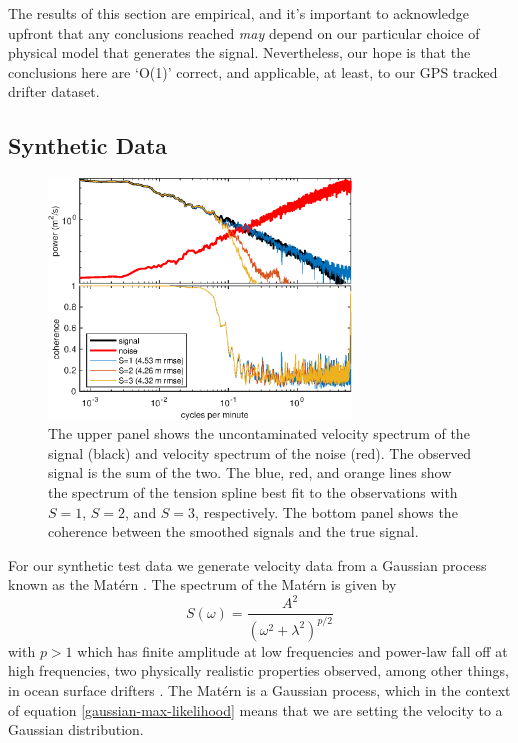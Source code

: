 \documentclass[10pt,journal]{IEEEtran}
\begin{document}
The results of this section are empirical, and it's important to acknowledge upfront that any conclusions reached \emph{may} depend on our particular choice of physical model that generates the signal. Nevertheless, our hope is that the conclusions here are `O(1)' correct, and applicable, at least, to our GPS tracked drifter dataset.

\subsection{Synthetic Data} \label{sec:synthetic_data}

\begin{figure}
  \centerline{\includegraphics[width=19pc,angle=0]{figures/synthetic_process_and_spectrum_slope2degreeVaried}}
  
  \caption{The upper panel shows the uncontaminated velocity spectrum of the signal (black) and velocity spectrum of the noise (red). The observed signal is the sum of the two. The blue, red, and orange lines show the spectrum of the tension spline best fit to the observations with $S=1$, $S=2$, and $S=3$, respectively. The bottom panel shows the coherence between the smoothed signals and the true signal.}
  \label{varied_slope}
\end{figure}

For our synthetic test data we generate velocity data from a Gaussian process known as the Mat\'ern \cite{lilly2017-npg}. The spectrum of the Mat\'ern is given by
\begin{equation}
S(\omega) = \frac{A^2}{(\omega^2 + \lambda^2)^{p/2}}
\end{equation}
with $p>1$ which has finite amplitude at low frequencies and power-law fall off at high frequencies, two physically realistic properties observed, among other things, in ocean surface drifters \cite{sykulski2016-jrssc}. The Mat\'ern is a Gaussian process, which in the context of equation \ref{gaussian-max-likelihood} means that we are setting the velocity to a Gaussian distribution.
\end{document}

